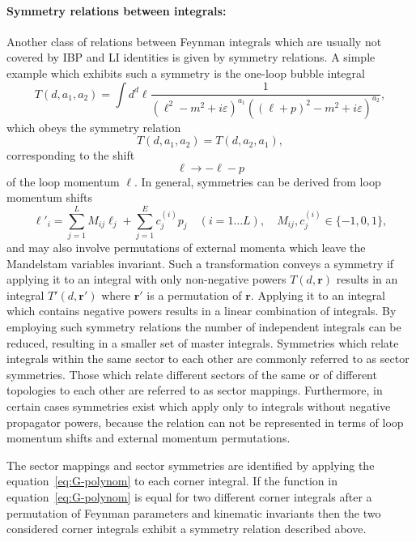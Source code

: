 \documentclass[a4paper,12pt]{scrartcl}
\newcommand*{\bm}{\boldsymbol}
\begin{document}
\paragraph{Symmetry relations between integrals:}
Another class of relations between Feynman integrals which are usually not
covered by IBP and LI identities is given by symmetry relations. A simple
example which exhibits such a symmetry is the one-loop bubble integral
\begin{equation}
  T(d,a_1,a_2) = \int d^d\ell \frac{1}{(\ell^2-m^2+i\varepsilon)^{a_1}
    ((\ell+p)^2-m^2+i\varepsilon)^{a_2}},
\end{equation}
which obeys the symmetry relation
\begin{equation}
  T(d,a_1,a_2) = T(d,a_2,a_1),
\end{equation}
corresponding to the shift
\begin{equation}
  \ell\to -\ell-p
\end{equation}
of the loop momentum $\ell$. In general, symmetries can be derived from loop
momentum shifts
\begin{equation}
  \ell'_i = \sum_{j=1}^{L} M_{ij} \ell_j + \sum_{j=1}^E c^{(i)}_j p_j
  \quad (i=1\ldots L),\quad M_{ij},c^{(i)}_j\in\{-1,0,1\},
\end{equation}
and may also involve permutations of external momenta which leave the Mandelstam
variables invariant. Such a transformation conveys a symmetry if applying it to
an integral with only non-negative powers $T(d,\bm{r})$ results in an integral
$T'(d,\bm{r}')$ where $\bm{r}'$ is a permutation of $\bm{r}$. Applying it to an
integral which contains negative powers results in a linear combination of
integrals. By employing such symmetry relations the number of independent
integrals can be reduced, resulting in a smaller set of master integrals.
Symmetries which relate integrals within the same sector to each other are
commonly referred to as sector symmetries. Those which relate different sectors of
the same or of different topologies to each other are referred to as sector
mappings. Furthermore, in certain cases symmetries exist which apply only to
integrals without negative propagator powers, because the relation can not be
represented in terms of loop momentum shifts and external momentum permutations.

The sector mappings and sector symmetries are identified by applying the 
equation~\eqref{eq:G-polynom} to each corner integral. If the function in 
equation~\eqref{eq:G-polynom} is equal for two different corner integrals after a 
permutation of Feynman parameters and kinematic invariants then 
the two considered corner integrals exhibit a symmetry relation described above.
\end{document}
